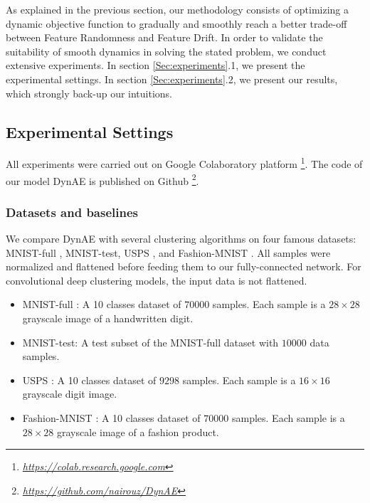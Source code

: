 \documentclass{article}
\begin{document}
\label{Sec:experiments}
As explained in the previous section, our methodology consists of optimizing a dynamic objective function to gradually and smoothly reach a better trade-off between Feature Randomness and Feature Drift. In order to validate the suitability of smooth dynamics in solving the stated problem, we conduct extensive experiments.
In section \ref{Sec:experiments}.1, we present the experimental settings. In section \ref{Sec:experiments}.2, we present our results, which strongly back-up our intuitions. 

\subsection{Experimental Settings} 
All experiments were carried out on Google Colaboratory platform \footnote{\textit{\url{https://colab.research.google.com}}}. The code of our model DynAE is published on Github \footnote{ \textit{\href{https://github.com/nairouz/DynAE}{https://github.com/nairouz/DynAE}}}.

\subsubsection{Datasets and baselines}


We compare DynAE with several clustering algorithms on four famous datasets: MNIST-full \cite{paper38}, MNIST-test, USPS \cite{paper39}, and Fashion-MNIST \cite{paper40}. All samples were normalized and flattened before feeding them to our fully-connected network. For convolutional deep clustering models, the input data is not flattened.

\begin{itemize}
    \item MNIST-full \cite{paper38}: A 10 classes dataset of $70000$ samples. Each sample is a $28\times28$ grayscale image of a handwritten digit. 
    \item MNIST-test: A test subset of the MNIST-full dataset with $10000$ data samples.  
    \item USPS \cite{paper39}: A 10 classes dataset of $9298$ samples. Each sample is a $16\times16$ grayscale digit image. 
    \item Fashion-MNIST \cite{paper40}: A 10 classes dataset of $70000$ samples. Each sample is a $28\times28$ grayscale image of a fashion product.
\end{itemize}
\end{document}
